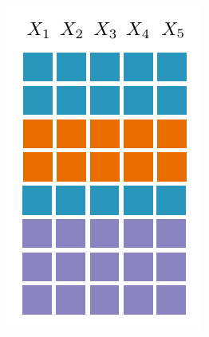 \documentclass[xcolor={usenames,dvipsnames,svgnames}, compress]{beamer}
\begin{document}
\begin{frame}
\begin{minipage}[t]{1.3462cm}
    \includegraphics[width=\linewidth]{figures/grid-1}
  \end{minipage}\hspace{10pt}\begin{minipage}[t]{1.3462cm}

\end{minipage}
\end{frame}
\end{document}
